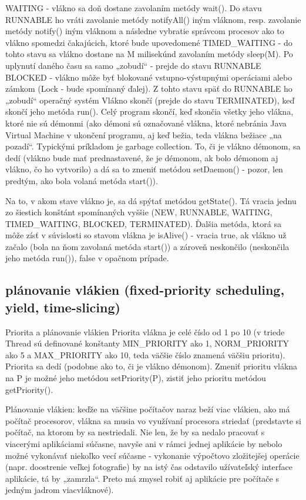 		WAITING - vlákno sa doň dostane zavolaním metódy wait(). Do stavu RUNNABLE ho vráti zavolanie metódy notifyAll() iným vláknom, resp. zavolanie metódy notify() iným vláknom a následne vybratie správcom procesov ako to vlákno spomedzi čakajúcich, ktoré bude upovedomené
		TIMED\_WAITING - do tohto stavu sa vlákno dostane na M milisekúnd zavolaním metódy sleep(M). Po uplynutí daného času sa samo „zobudí“ - prejde do stavu RUNNABLE
		BLOCKED - vlákno môže byť blokované vstupno-výstupnými operáciami alebo zámkom (Lock - bude spomínaný ďalej). Z tohto stavu späť do RUNNABLE ho „zobudí“ operačný systém
		Vlákno skončí (prejde do stavu TERMINATED), keď skončí jeho metóda run(). Celý program skončí, keď skončia všetky jeho vlákna, ktoré nie sú démonmi (ako démoni sú označované vlákna, ktoré nebránia Java Virtual Machine v ukončení programu, aj keď bežia, teda vlákna bežiace „na pozadí“. Typickými príkladom je garbage collection. To, či je vlákno démonom, sa dedí (vlákno bude mať prednastavené, že je démonom, ak bolo démonom aj vlákno, čo ho vytvorilo) a dá sa to zmeniť metódou setDaemon() - pozor, len predtým, ako bola volaná metóda start()).

		Na to, v akom stave vlákno je, sa dá spýtať metódou getState(). Tá vracia jednu zo šiestich konštánt spomínaných vyššie (NEW, RUNNABLE, WAITING, TIMED\_WAITING, BLOCKED, TERMINATED). Ďalšia metóda, ktorá sa môže zísť v súvislosti so stavom vlákna je isAlive() - vracia true, ak vlákno už začalo (bola na ňom zavolaná metóda start()) a zároveň neskončilo (neskončila jeho metóda run()), false v opačnom prípade.


	\subsection{plánovanie vlákien (fixed-priority scheduling, yield, time-slicing)}
Priorita a plánovanie vlákien
Priorita vlákna je celé číslo od 1 po 10 (v triede Thread sú definované konštanty MIN\_PRIORITY ako 1, NORM\_PRIORITY ako 5 a MAX\_PRIORITY ako 10, teda väčšie číslo znamená väčšiu prioritu). Priorita sa dedí (podobne ako to, či je vlákno démonom). Zmeniť prioritu vlákna na P je možné jeho metódou setPriority(P), zistiť jeho prioritu metódou getPriority().


Plánovanie vlákien: keďže na väčšine počítačov naraz beží viac vlákien, ako má počítač procesorov, vlákna sa musia vo využívaní procesora striedať (predstavte si počítač, na ktorom by sa nestriedali. Nie len, že by sa nedalo pracovať s viacerými aplikáciami súčasne, navyše ani v rámci jednej aplikácie by nebolo možné vykonávať niekoľko vecí súčasne - vykonanie výpočtovo zložitejšej operácie (napr. doostrenie veľkej fotografie) by na istý čas odstavilo užívateľský interface aplikácie, tá by „zamrzla“. Preto má zmysel robiť aj aplikácie pre počítače s jedným jadrom viacvláknové).

